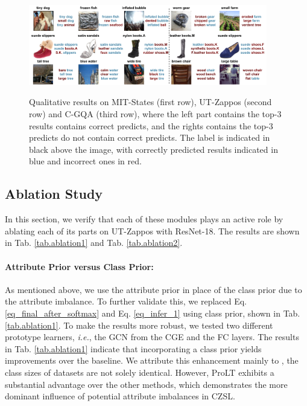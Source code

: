\documentclass[letterpaper]{article} %
\newcommand{\ie}{\textit{i.e.}}
\theoremstyle{definition}
\begin{document}
 	\begin{figure}[t]
		\centering
		\subfigure
		{
			\includegraphics[width=0.93\textwidth]{ Fig_quanlity.pdf}
		}
		\caption{Qualitative results on MIT-States (first row), UT-Zappos (second row) and C-GQA (third row), where the left part contains the top-3 results contains correct predicts, and the rights contains the top-3 predicts do not contain correct predicts. The label is indicated in black above the image, with correctly predicted results indicated in blue and incorrect ones in red.}
		\label{fig_qua}
	\end{figure}
\subsection{Ablation Study} \label{subsec.ablation}
In this section, we verify that each of these modules plays an active role by ablating each of its parts on UT-Zappos with ResNet-18. The results are shown in Tab. \ref{tab.ablation1} and Tab. \ref{tab.ablation2}.
\paragraph{Attribute Prior versus Class Prior:} As mentioned above, we use the attribute prior in place of the class prior due to the attribute imbalance. To further validate this, we replaced Eq. \ref{eq_final_after_softmax} and Eq. \ref{eq_infer_1} using class prior, shown in Tab. \ref{tab.ablation1}. To make the results more robust, we tested two different prototype learners, \ie, the GCN from the CGE \cite{naeem2021learning} and the FC layers. The results in Tab. \ref{tab.ablation1} indicate that incorporating a class prior yields improvements over the baseline. We attribute this enhancement mainly to \citet{menon2020long}, the class sizes of datasets are not solely identical. However, ProLT exhibits a substantial advantage over the other methods, which demonstrates the more dominant influence of potential attribute imbalances in CZSL.
\end{document}
